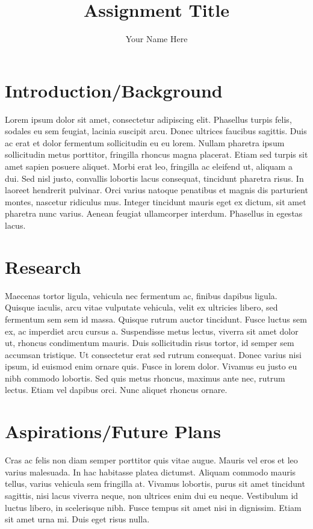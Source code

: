 \documentclass[11pt]{article}
\title{\textbf{Assignment Title}}
\author{Your Name Here}
\date{}
\begin{document}
\clearpage\maketitle
\thispagestyle{empty}

\section{Introduction/Background}
Lorem ipsum dolor sit amet, consectetur adipiscing elit. Phasellus turpis felis, sodales eu sem feugiat, lacinia suscipit arcu. Donec ultrices faucibus sagittis. Duis ac erat et dolor fermentum sollicitudin eu eu lorem. Nullam pharetra ipsum sollicitudin metus porttitor, fringilla rhoncus magna placerat. Etiam sed turpis sit amet sapien posuere aliquet. Morbi erat leo, fringilla ac eleifend ut, aliquam a dui. Sed nisl justo, convallis lobortis lacus consequat, tincidunt pharetra risus. In laoreet hendrerit pulvinar. Orci varius natoque penatibus et magnis dis parturient montes, nascetur ridiculus mus. Integer tincidunt mauris eget ex dictum, sit amet pharetra nunc varius. Aenean feugiat ullamcorper interdum. Phasellus in egestas lacus. 

\section{Research}
 Maecenas tortor ligula, vehicula nec fermentum ac, finibus dapibus ligula. Quisque iaculis, arcu vitae vulputate vehicula, velit ex ultricies libero, sed fermentum sem sem id massa. Quisque rutrum auctor tincidunt. Fusce luctus sem ex, ac imperdiet arcu cursus a. Suspendisse metus lectus, viverra sit amet dolor ut, rhoncus condimentum mauris. Duis sollicitudin risus tortor, id semper sem accumsan tristique. Ut consectetur erat sed rutrum consequat. Donec varius nisi ipsum, id euismod enim ornare quis. Fusce in lorem dolor. Vivamus eu justo eu nibh commodo lobortis. Sed quis metus rhoncus, maximus ante nec, rutrum lectus. Etiam vel dapibus orci. Nunc aliquet rhoncus ornare.

\section{Aspirations/Future Plans}
Cras ac felis non diam semper porttitor quis vitae augue. Mauris vel eros et leo varius malesuada. In hac habitasse platea dictumst. Aliquam commodo mauris tellus, varius vehicula sem fringilla at. Vivamus lobortis, purus sit amet tincidunt sagittis, nisi lacus viverra neque, non ultrices enim dui eu neque. Vestibulum id luctus libero, in scelerisque nibh. Fusce tempus sit amet nisi in dignissim. Etiam sit amet urna mi. Duis eget risus nulla. 
\end{document}
